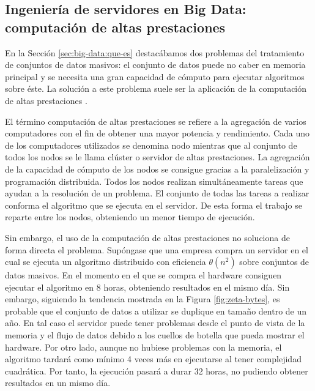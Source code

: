 \documentclass[10pt]{article}
\begin{document}
	\subsection{Ingeniería de servidores en Big Data: computación de altas prestaciones} \label{sec:big-data:ise}
	
		En la Sección \ref{sec:big-data:que-es} destacábamos dos problemas del tratamiento de conjuntos de datos masivos: el conjunto de datos puede no caber en memoria principal y se necesita una gran capacidad de cómputo para ejecutar algoritmos sobre éste. La solución a este problema suele ser la aplicación de la computación de altas prestaciones \cite{hpc}.
		
		El término computación de altas prestaciones se refiere a la agregación de varios computadores con el fin de obtener una mayor potencia y rendimiento. Cada uno de los computadores utilizados se denomina nodo mientras que al conjunto de todos los nodos se le llama clúster o servidor de altas prestaciones. La agregación de la capacidad de cómputo de los nodos se consigue gracias a la paralelización y programación distribuida. Todos los nodos realizan simultáneamente tareas que ayudan a la resolución de un problema. El conjunto de todas las tareas a realizar conforma el algoritmo que se ejecuta en el servidor. De esta forma el trabajo se reparte entre los nodos, obteniendo un menor tiempo de ejecución.
		
		Sin embargo, el uso de la computación de altas prestaciones no soluciona de forma directa el problema. Supóngase que una empresa compra un servidor en el cual se ejecuta un algoritmo distribuido con eficiencia $\theta(n^2)$ sobre conjuntos de datos masivos. En el momento en el que se compra el hardware consiguen ejecutar el algoritmo en 8 horas, obteniendo resultados en el mismo día. Sin embargo, siguiendo la tendencia mostrada en la Figura \ref{fig:zeta-bytes}, es probable que el conjunto de datos a utilizar se duplique en tamaño dentro de un año. En tal caso el servidor puede tener problemas desde el punto de vista de la memoria y el flujo de datos debido a los cuellos de botella que pueda mostrar el hardware. Por otro lado, aunque no hubiese problemas con la memoria, el algoritmo tardará como mínimo 4 veces más en ejecutarse al tener complejidad cuadrática. Por tanto, la ejecución pasará a durar 32 horas, no pudiendo obtener resultados en un mismo día. 
				
\end{document}
